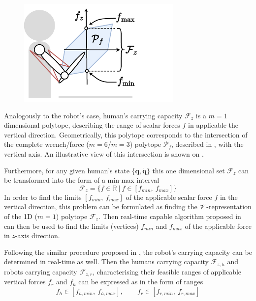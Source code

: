 \begin{figure}
    \centering
    \includegraphics[width=\linewidth]{Papers/images/carrying_capacity_human.pdf}
    \caption{}
    \label{fig:carrying_cap_human}
\end{figure}
Analogously to the robot's case, human's carrying capacity $\mathcal{F}_z$ is a $m=1$ dimensional polytope, describing the range of scalar forces $f$ in applicable the vertical direction. Geometrically, this polytope corresponds to the intersection of the complete wrench/force ($m=6$/$m=3$) polytope $\mathcal{P}_f$, described in , with the vertical axis. An illustrative view of this intersection is shown on .

Furthermore, for any given human's state $\{\bm{q},\dot{\bm{q}}\}$ this one dimensional set $\mathcal{F}_z$ can be transformed into the form of a min-max interval
\begin{equation}
    \mathcal{F}_z = \{ f \in \mathbb{R} ~|~ f \in[{f}_{min}, ~{f}_{max}]\}
\end{equation}
In order to find the limits $[f_{min},~f_{max}]$ of the applicable scalar force $f$ in the vertical direction, this problem can be formulated as finding the $\mathscr{V}$-representation of the 1D ($m=1$) polytope $\mathcal{F}_z$. Then real-time capable algorithm proposed in  can then be used to find the limits (vertices) $f_{min}$ and $f_{max}$ of the applicable force in $z$-axis direction.  

Following the similar procedure proposed in , the robot's carrying capacity can be determined in real-time as well. Then the humans carrying capacity $\mathcal{F}_{z,h}$ and robots carrying capacity $\mathcal{F}_{z,r}$, characterising their feasible ranges of applicable vertical forces $f_r$ and $f_h$ can be expressed as in the form of ranges
\begin{equation}
    f_{h}\in [f_{h,min}, ~f_{h,max}], \qquad f_{r} \in [f_{r,min}, ~f_{r,max} ]
    \label{eq:human_robot_carrying_capacity}
\end{equation}

